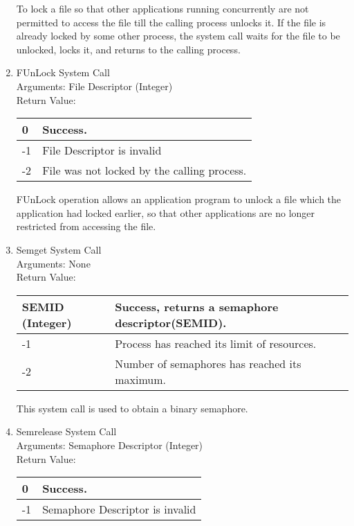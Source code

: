 \begin{enumerate}
To lock a file so that other applications running concurrently are not permitted to access the file till the calling process unlocks it. If the file is already locked by some other process, the system call waits for the file to be unlocked, locks it, and returns to the calling process.   


\item{FUnLock System Call}
\\
Arguments: File Descriptor (Integer)\\
Return Value:
\FloatBarrier \begin{table}[H]
\centering
\begin{tabular}{|l|l|}
\hline
0	& Success. \\ \hline
-1	& File Descriptor is invalid \\ \hline
-2	& File was not locked by the calling process. \\ \hline
\end{tabular}
\end{table} \FloatBarrier 

FUnLock operation allows an application program to unlock a file which the application had locked earlier, so that other applications are no longer restricted from accessing the file.   
 

\item{Semget System Call}
\\
Arguments: None\\
Return Value:
\FloatBarrier \begin{table}[H]
\centering
\begin{tabular}{|l|l|}
\hline
SEMID (Integer)	& Success, returns a semaphore descriptor(SEMID). \\\hline
-1	& Process has reached its limit of resources. \\ \hline
-2	& Number of semaphores has reached its maximum. \\ \hline
\end{tabular}
\end{table} \FloatBarrier 

This system call is used to obtain a binary semaphore. 

\item{Semrelease System Call}
\\
Arguments: Semaphore Descriptor (Integer)\\
Return Value:
\FloatBarrier \begin{table}[H]
\centering
\begin{tabular}{|l|l|}
\hline
0	& Success. \\\hline
-1	& Semaphore Descriptor is invalid \\ \hline
\end{tabular}
\end{table} \FloatBarrier 


\end{enumerate}
